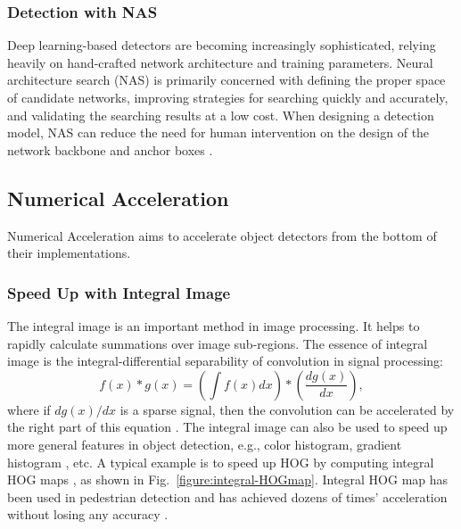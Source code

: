 \documentclass[lettersize,journal]{IEEEtran}
\begin{document}
\subsubsection{Detection with NAS}

Deep learning-based detectors are becoming increasingly sophisticated, relying heavily on hand-crafted network architecture and training parameters. Neural architecture search (NAS) is primarily concerned with defining the proper space of candidate networks, improving strategies for searching quickly and accurately, and validating the searching results at a low cost. When designing a detection model, NAS can reduce the need for human intervention on the design of the network backbone and anchor boxes \cite{chen2019detnas, xu2019auto, ghiasi2019fpn, guo2020hit, wang2020fcos, yao2020sm, jiang2020sp}.


\subsection{Numerical Acceleration}\label{subsec:num_acceleratino}

Numerical Acceleration aims to accelerate object detectors from the bottom of their implementations.

\subsubsection{Speed Up with Integral Image}

The integral image is an important method in image processing. It helps to rapidly calculate summations over image sub-regions. The essence of integral image is the integral-differential separability of convolution in signal processing:
\begin{equation}
f(x) * g(x) = (\int f(x)dx) * (\frac{d g(x)}{dx}),
\end{equation}
where if $d g(x) / dx$ is a sparse signal, then the convolution can be accelerated by the right part of this equation \cite{CVPR01-VJ, NIPS98-Boxlets}. 
The integral image can also be used to speed up more general features in object detection, e.g., color histogram, gradient histogram \cite{ICCV09-HOGLBP, CVPR06-FastHOG, CVPR05-IntegralHist, BMVC09-Integral}, etc. A typical example is to speed up HOG by computing integral HOG maps \cite{ICCV09-HOGLBP, CVPR06-FastHOG}, as shown in Fig.\ \ref{figure:integral-HOGmap}. Integral HOG map has been used in pedestrian detection and has achieved dozens of times' acceleration without losing any accuracy \cite{CVPR06-FastHOG}.
\end{document}
